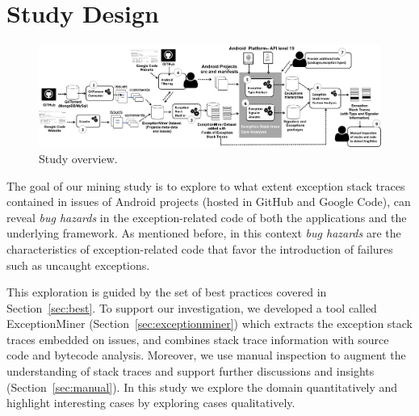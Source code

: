 \documentclass[conference]{IEEEtran}
\begin{document}
\section{Study Design}
\label{sec:study}


\begin{figure} 
\centering \includegraphics[width=.9\hsize]{overview_review.png}
\caption{Study overview.}\label{fig:overview} 
\end{figure}


The goal of our mining study is to explore to what extent exception stack traces 
contained in issues of Android projects (hosted in GitHub and Google Code), can reveal 
\emph{bug hazards} in the exception-related code of both the applications and the underlying framework. 
As mentioned before, in this context \emph{bug hazards} are the characteristics of exception-related code 
that favor the introduction of failures such as uncaught exceptions. 

This exploration is guided by the set of best practices covered in Section~\ref{sec:best}.
To support our investigation, we developed a tool called ExceptionMiner (Section~\ref{sec:exceptionminer})
which extracts the exception stack traces embedded on issues, 
and combines stack trace information with source code and bytecode 
analysis. Moreover, we use manual inspection to augment
 the understanding of stack traces and support further discussions and insights (Section~\ref{sec:manual}).
In this study we explore the domain quantitatively and highlight interesting cases by 
exploring cases qualitatively. 
\end{document}
